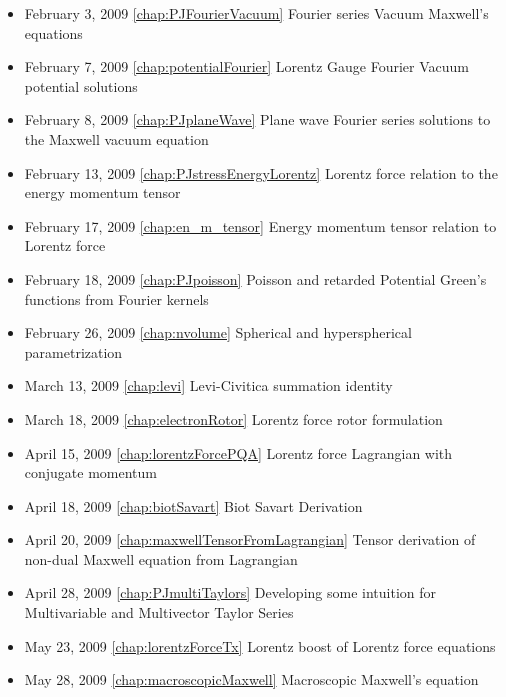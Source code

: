 \begin{itemize}
\item February 3, 2009 \ref{chap:PJFourierVacuum} Fourier series Vacuum Maxwell's equations

\item February 7, 2009 \ref{chap:potentialFourier} Lorentz Gauge Fourier Vacuum potential solutions

\item February 8, 2009 \ref{chap:PJplaneWave} Plane wave Fourier series solutions to the Maxwell vacuum equation

\item February 13, 2009 \ref{chap:PJstressEnergyLorentz} Lorentz force relation to the energy momentum tensor

\item February 17, 2009 \ref{chap:en_m_tensor} Energy momentum tensor relation to Lorentz force

\item February 18, 2009 \ref{chap:PJpoisson} Poisson and retarded Potential Green's functions from Fourier kernels

\item February 26, 2009 \ref{chap:nvolume} Spherical and hyperspherical parametrization

\item March 13, 2009 \ref{chap:levi} Levi-Civitica summation identity

\item March 18, 2009 \ref{chap:electronRotor} Lorentz force rotor formulation

\item April 15, 2009 \ref{chap:lorentzForcePQA} Lorentz force Lagrangian with conjugate momentum

\item April 18, 2009 \ref{chap:biotSavart} Biot Savart Derivation

\item April 20, 2009 \ref{chap:maxwellTensorFromLagrangian} Tensor derivation of non-dual Maxwell equation from Lagrangian

\item April 28, 2009 \ref{chap:PJmultiTaylors} Developing some intuition for Multivariable and Multivector Taylor Series

\item May 23, 2009 \ref{chap:lorentzForceTx} Lorentz boost of Lorentz force equations

\item May 28, 2009 \ref{chap:macroscopicMaxwell} Macroscopic Maxwell's equation

\end{itemize}

